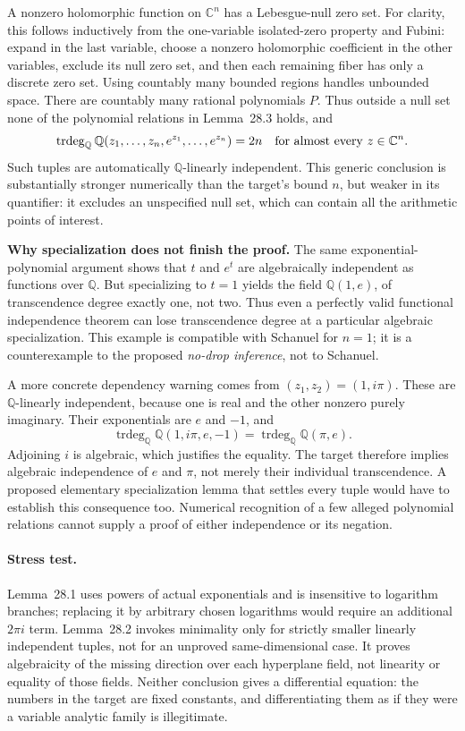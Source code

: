 \documentclass[11pt,a4paper]{article}
\newcommand{\Q}{\mathbb{Q}}
\newcommand{\C}{\mathbb{C}}
\numberwithin{equation}{section}
\begin{document}
A nonzero holomorphic function on $\C^n$ has a Lebesgue-null zero set.
For clarity, this follows inductively from the one-variable isolated-zero
property and Fubini: expand in the last variable, choose a nonzero
holomorphic coefficient in the other variables, exclude its null zero
set, and then each remaining fiber has only a discrete zero set. Using
countably many bounded regions handles unbounded space. There are
countably many rational polynomials $P$. Thus outside a null set none
of the polynomial relations in Lemma~28.3 holds, and
\begin{equation}\label{r28:generic}
 \operatorname{trdeg}_{\Q}\Q(z_1,\ldots,z_n,e^{z_1},\ldots,e^{z_n})=2n
 \quad\hbox{for almost every }z\in\C^n.
\end{equation}
Such tuples are automatically $\Q$-linearly independent. This generic
conclusion is substantially stronger numerically than the target's
bound $n$, but weaker in its quantifier: it excludes an unspecified
null set, which can contain all the arithmetic points of interest.

\medskip
\textbf{Why specialization does not finish the proof.}
The same exponential-polynomial argument shows that $t$ and $e^t$ are
algebraically independent as functions over $\Q$. But specializing to
$t=1$ yields the field $\Q(1,e)$, of transcendence degree exactly one,
not two. Thus even a perfectly valid functional independence theorem
can lose transcendence degree at a particular algebraic specialization.
This example is compatible with Schanuel for $n=1$; it is a counterexample
to the proposed \emph{no-drop inference}, not to Schanuel.

A more concrete dependency warning comes from $(z_1,z_2)=(1,i\pi)$.
These are $\Q$-linearly independent, because one is real and the other
nonzero purely imaginary. Their exponentials are $e$ and $-1$, and
\[
 \operatorname{trdeg}_{\Q}\Q(1,i\pi,e,-1)
                  =\operatorname{trdeg}_{\Q}\Q(\pi,e).
\]
Adjoining $i$ is algebraic, which justifies the equality. The target
therefore implies algebraic independence of $e$ and $\pi$, not merely
their individual transcendence. A proposed elementary specialization
lemma that settles every tuple would have to establish this consequence
too. Numerical recognition of a few alleged polynomial relations cannot
supply a proof of either independence or its negation.

\paragraph{Stress test.}
Lemma~28.1 uses powers of actual exponentials and is insensitive to
logarithm branches; replacing it by arbitrary chosen logarithms would
require an additional $2\pi i$ term. Lemma~28.2 invokes minimality only
for strictly smaller linearly independent tuples, not for an unproved
same-dimensional case. It proves algebraicity of the missing direction
over each hyperplane field, not linearity or equality of those fields.
Neither conclusion gives a differential equation: the numbers in the
target are fixed constants, and differentiating them as if they were a
variable analytic family is illegitimate.
\end{document}
